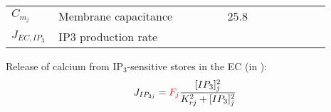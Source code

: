 \documentclass[fleqn]{report}
\numberwithin{equation}{section}
\numberwithin{equation}{section}
\newcommand{\NO}{\text{NO}}
\newcommand{\eNOSact}{\text{eNOS$_{\text{act}}$}}
\newcommand{\LArg}{\text{L-Arg}}
\newcommand{\Otwo}{\text{O$_2$}}
\newcommand{\Ca}{\text{Ca$^{2+}$}}
\newcommand{\NOj}{\text{[NO]$_j$}}
\newcommand{\uMpers}{\textmu M\,s$^{-1}$}
\newcommand\pNO[1]{\text{$p_{\text{NO},#1}$}}
\newcommand\cNO[1]{\text{$c_{\text{NO},#1}$}}
\newcommand\dNO[1]{\text{$d_{\text{NO},#1}$}}
\begin{document}
 			\begin{table}[h!]
 			\centering
 			\begin{tabular}{ p{0.09\linewidth}  >{\footnotesize} p{0.5\linewidth}  >{\footnotesize} p{0.27\linewidth} >{\footnotesize} p{0.03\linewidth} }
 			\hline
 			 $C_{m_{j}}$				& Membrane capacitance												& 25.8  \pF		& \cite{Koenigsberger2006} \\
 			 $ J_{EC,IP_3} $  & \gls{IP3} production rate & \uMps & \cite{Koenigsberger2006}  \\
 			\hline
 			\end{tabular}
 			\label{tab:JSRuptakei}
 			\end{table}
% 								
% 						
% 						
% 		
 									Release of calcium from IP$_{3}$-sensitive stores in the EC (in \uMps):
 									\begin{equation} \label{eq:JIP3j}
 									J_{IP_{3j}} = \textcolor{red}{F_{j}}\frac{[IP_{3}]_{j}^{2}}{K_{rj}^{2}+[IP_{3}]_{j}^{2}}
 									\end{equation}
\end{document}
